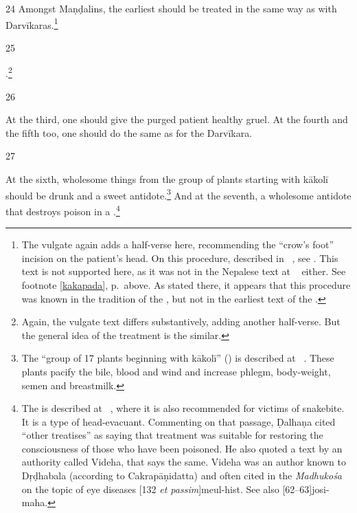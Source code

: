 \begin{translation}
\item [24] Amongst Maṇḍalins, the earliest 
should be treated in the same way as with
Darvīkaras.\footnote{\label{crowsfoot}The vulgate again adds a half-verse
    here, recommending the “crow's foot” incision on the patient's head. On
    this procedure, described in  \CS\ , see
    \cite[145]{wuja-2003}. This text is not supported here, as it was not in
    the Nepalese text at \SS\  either. See footnote
    \ref{kakapada}, p.\,\pageref{kakapada} above.  As stated there, it
    appears that this procedure was known in the tradition of the \CS, but
    not in the earliest text of the \SS.}
    
\item [25]

.\footnote{Again, the vulgate text differs substantively, adding 
another half-verse.  But the general idea of the treatment is the 
similar.}

\item [26]

At the third, one should give the purged patient healthy gruel. At the fourth and 
the fifth too, one should do the same as for the Darvīkara.

\item [27]

At the sixth, wholesome things from the group of plants starting with
\gls{kākolī} should be drunk and a sweet antidote.\footnote{The “group of
    17 plants beginning with \gls{kākolī}” () is
    described at \SS\ . These plants pacify the bile,
    blood and wind and increase phlegm, body-weight, semen and breastmilk.}
    And at the seventh, a wholesome antidote that destroys poison in a
    .\footnote{The  is described at
        \SS\ , where it is also recommended for victims of
        snakebite.  It is a type of head-evacuant. Commenting on that passage,
        Ḍalhaṇa cited “other treatises” as saying that  treatment
        was suitable for restoring the consciousness of those who have been
        poisoned.  He also quoted a text by an authority called Videha, that says
        the same.  Videha was an author known to Dṛḍhabala (according to
        Cakrapāṇidatta) and often cited in the \emph{Madhukośa} on the topic of
        eye diseases [132 \emph{et passim}]{meul-hist}. See also
        [62--63]{josi-maha}.}


\end{translation}
